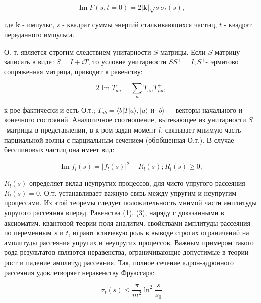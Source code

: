 \documentclass[10pt]{article}
\begin{document}
\[

\operatorname{Im} F(s, t=0)=2|\boldsymbol{k}| \sqrt{s} \sigma_{t}(s),

\]



где $\boldsymbol{k}$ - импульс, $s$ - квадрат суммы энергий сталкивающихся частиц, $t$ - квадрат переданного импульса.



О. т. является строгим следствием унитарности $S$-матрицы. Если $S$-матрицу записать в виде: $S=I+i T$, то условие унитарности $S S^{+}=I, S^{+}$- эрмитово сопряженная матрица, приводит к равенству:



\[

2 \operatorname{Im} T_{a a}=\sum_{n} T_{a n} T_{n a}^{+},

\]



к-рое фактически и есть О.т.; $T_{a b}=\langle b|T| a\rangle,|a\rangle$ и $|b\rangle-$ векторы начального и конечного состояний. Аналогичное соотношение, вытекающее из унитарности $S$-матрицы в представлении, в к-ром задан момент $l$, связывает мнимую часть парциальной волны с парциальным сечением (обобщенная О.т.). В случае бесспиновых частиц она имеет вид:



\[

\operatorname{Im} f_{l}(s)=\left|f_{l}(s)\right|^{2}+R_{l}(s) ; R_{l}(s) \geqslant 0 ;

\]



$R_{l}(s)$ определяет вклад неупругих процессов, для чисто упругого рассеяния $R_{l}(s)=0$. О.т. устанавливает важную связь между упругим и неупругим процессами. Из этой теоремы следует положительность мнимой части амплитуды упругого рассеяния вперед. Равенства (1), (3), наряду с доказанными в аксиоматич. квантовой теории поля аналитич. свойствами амплитуды рассеяния по переменным $s$ и $t$, играют ключевую роль в выводе строгих ограничений на амплитуды рассеяния упругих и неупругих процессов. Важным примером такого рода результатов являются неравенства, ограничивающие допустимые в теории рост и падение амплитуд рассеяния. Так, полное сечение адрон-адронного рассеяния удовлетворяет неравенству Фруассара:



\[

\sigma_{t}(s) \leqslant \frac{\pi}{m^{2}} \ln ^{2} \frac{s}{s_{0}}

\]
\end{document}
